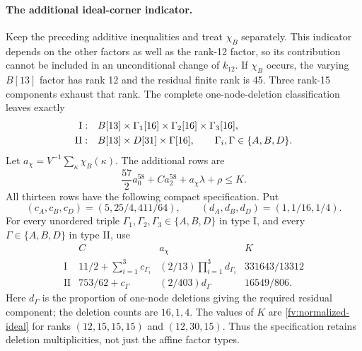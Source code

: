\documentclass[11pt]{article}
\theoremstyle{definition}
\theoremstyle{remark}
\numberwithin{equation}{section}
\begin{document}
\paragraph{The additional ideal-corner indicator.}
Keep the preceding additive inequalities and treat $\chi_B$
separately. This indicator depends on the other factors as well as
the rank-12 factor, so its contribution cannot be included in an
unconditional change of $k_{12}$.
If $\chi_B$ occurs, the varying $B[13]$ factor has rank 12 and
the residual finite rank is 45. Three rank-15 components exhaust that
rank. The complete one-node-deletion classification leaves exactly
\begin{align}
 \mathrm{I}:&\quad B[13]\times\Gamma_1[16]
                   \times\Gamma_2[16]\times\Gamma_3[16],\notag\\
 \mathrm{II}:&\quad B[13]\times D[31]\times\Gamma[16],
 \qquad\Gamma_i,\Gamma\in\{A,B,D\}.
 \label{fv:guarded-links}
\end{align}
Let $a_\chi=V^{-1}\sum_\kappa\chi_B(\kappa)$. The additional rows are
\begin{equation}\label{fv:guarded-rows}
  \frac{57}{2}a^{58}_0+C a^{58}_2+a_\chi\lambda+\rho\le K.
\end{equation}
All thirteen rows have the following compact specification. Put
\[
 (c_A,c_B,c_D)=(5,25/4,411/64),\qquad
 (d_A,d_B,d_D)=(1,1/16,1/4).
\]
For every unordered triple $\Gamma_1,\Gamma_2,\Gamma_3\in\{A,B,D\}$
in type I, and every $\Gamma\in\{A,B,D\}$ in type II, use
\begin{equation}\label{fv:guarded-data}
\begin{array}{c|ccc}
 &C&a_\chi&K\\\hline
 \mathrm{I}&11/2+\sum_{i=1}^3c_{\Gamma_i}
       &(2/13)\prod_{i=1}^3d_{\Gamma_i}&331643/13312\\
 \mathrm{II}&753/62+c_\Gamma&(2/403)d_\Gamma&16549/806.
\end{array}
\end{equation}
Here $d_\Gamma$ is the proportion of one-node deletions giving the
required residual component; the deletion counts are $16,1,4$.
The values of $K$ are \eqref{fv:normalized-ideal} for ranks
$(12,15,15,15)$ and $(12,30,15)$. Thus the specification retains
deletion multiplicities, not just the affine factor types.
\end{document}
